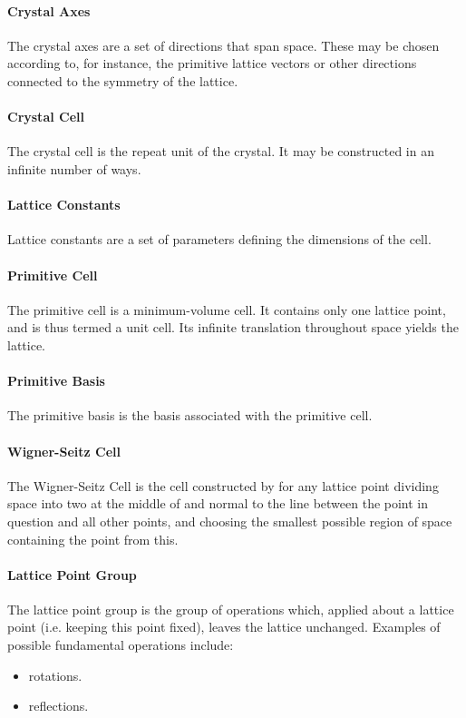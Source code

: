 \paragraph{Crystal Axes}
The crystal axes are a set of directions that span space. These may be chosen according to, for instance, the primitive lattice vectors or other directions connected to the symmetry of the lattice.

\paragraph{Crystal Cell}
The crystal cell is the repeat unit of the crystal. It may be constructed in an infinite number of ways.

\paragraph{Lattice Constants}
Lattice constants are a set of parameters defining the dimensions of the cell.

\paragraph{Primitive Cell}
The primitive cell is a minimum-volume cell. It contains only one lattice point, and is thus termed a unit cell. Its infinite translation throughout space yields the lattice.

\paragraph{Primitive Basis}
The primitive basis is the basis associated with the primitive cell.

\paragraph{Wigner-Seitz Cell}
The Wigner-Seitz Cell is the cell constructed by for any lattice point dividing space into two at the middle of and normal to the line between the point in question and all other points, and choosing the smallest possible region of space containing the point from this.

\paragraph{Lattice Point Group}
The lattice point group is the group of operations which, applied about a lattice point (i.e. keeping this point fixed), leaves the lattice unchanged. Examples of possible fundamental operations include:
\begin{itemize}
	\item rotations.
	\item reflections.
\end{itemize}

